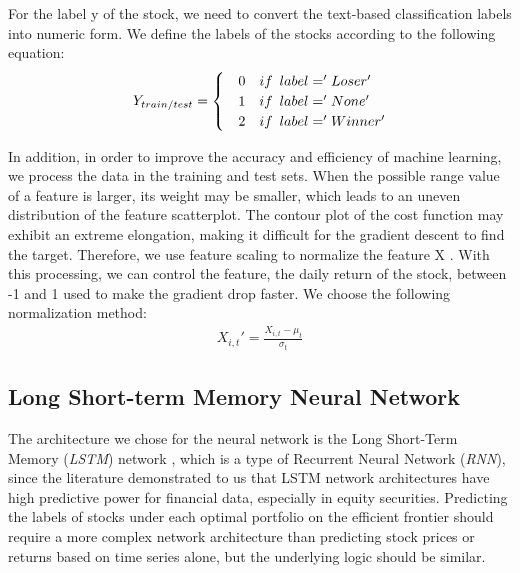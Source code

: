 \documentclass[default,iicol]{sn-jnl}%
\begin{document}
For the label y of the stock, we need to convert the text-based classification labels into numeric form. We define the labels of the stocks according to the following equation:
\begin{align}
	Y_{train/test}=\begin{cases}
		& \text 0 \hspace{1em}if \hspace{0.5em}label='Loser' \\
		& \text 1 \hspace{1em}if \hspace{0.5em}label='None'\\
		& \text 2 \hspace{1em}if \hspace{0.5em}label='Winner'
	\end{cases}
\label{eq8}
\end{align}

In addition, in order to improve the accuracy and efficiency of machine learning, we process the data in the training and test sets. When the possible range value of a feature is larger, its weight may be smaller, which leads to an uneven distribution of the feature scatterplot. The contour plot of the cost function may exhibit an extreme elongation, making it difficult for the gradient descent to find the target. Therefore, we use feature scaling to normalize the feature X \cite{fu2018machine}. With this processing, we can control the feature, the daily return of the stock, between -1 and 1 used to make the gradient drop faster. We choose the following normalization method:
\begin{align}
	X_{i,t}' =\frac{X_{i,t}-\mu_{t}}{\sigma _{t}} 
\label{eq9}
\end{align}

\subsection{Long Short-term Memory Neural Network}\label{sec5sub2}
\hspace{1.5em}The architecture we chose for the neural network is the Long Short-Term Memory (\textit{LSTM}) network \cite{1997Long}, which is a type of Recurrent Neural Network (\textit{RNN}), since the literature \cite{2018Deep,2020Portfolio} demonstrated to us that LSTM network architectures have high predictive power for financial data, especially in equity securities. Predicting the labels of stocks under each optimal portfolio on the efficient frontier should require a more complex network architecture than predicting stock prices or returns based on time series alone, but the underlying logic should be similar.
\end{document}

